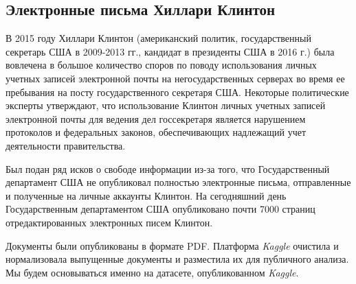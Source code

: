 \subsection{Электронные письма Хиллари Клинтон}

В 2015 году Хиллари Клинтон (американский политик, государственный секретарь США в 2009-2013 гг., кандидат в президенты США в 2016 г.) была вовлечена в большое количество споров по поводу использования личных учетных записей электронной почты на негосударственных серверах во время ее пребывания на посту государственного секретаря США. Некоторые политические эксперты утверждают, что использование Клинтон личных учетных записей электронной почты для ведения дел госсекретаря является нарушением протоколов и федеральных законов, обеспечивающих надлежащий учет деятельности правительства. 



Был подан ряд исков о свободе информации из-за того, что Государственный департамент США не опубликовал полностью электронные письма, отправленные и полученные на личные аккаунты Клинтон. На сегодняшний день Государственным департаментом США опубликовано почти 7000 страниц отредактированных электронных писем Клинтон. 

Документы были опубликованы в формате PDF. Платформа \textit{Kaggle} очистила и нормализовала выпущенные документы и разместила их для публичного анализа. Мы будем основываться именно на датасете, опубликованном \textit{Kaggle}.